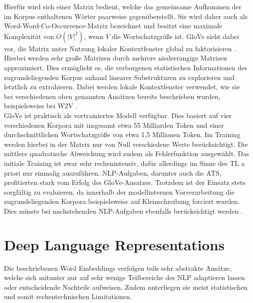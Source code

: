 \noindent
Hierfür wird sich einer Matrix bedient, welche das gemeinsame Aufkommen der im Korpus enthaltenen Wörter paarweise gegenüberstellt. Sie wird daher auch als Word-Word-Co-Occurrence-Matrix bezeichnet und besitzt eine maximale Komplexität von $O(|V|^2)$, wenn $V$ die Wortschatzgröße ist. \ac{GloVe} sieht dabei vor, die Matrix unter Nutzung lokaler Kontextfenster global zu faktorisieren \cite[S.~2]{PEN14}.\\

\noindent
Hierbei werden sehr große Matrizen durch mehrere niederrangige Matrizen approximiert. Dies ermöglicht es, die verborgenen statistischen Informationen des zugrundeliegenden Korpus anhand linearer Substrukturen zu explorieren und letztlich zu extrahieren. Dabei werden lokale Kontextfenster verwendet, wie sie bei verschiedenen oben genannten Ansätzen bereits beschrieben wurden, beispielsweise bei \ac{W2V} \cite[S.~24]{NIT19}.\\

\noindent
\ac{GloVe} ist praktisch als vortrainiertes Modell verfügbar. Dies basiert auf vier verschiedenen Korpora mit insgesamt etwa 55 Milliarden Token und einer durchschnittlichen Wortschatzgröße von etwa 1,5 Millionen Token. Im Training werden hierbei in der Matrix nur von Null verschiedene Werte berücksichtigt. Die mittlere quadratische Abweichung wird zudem als Fehlerfunktion ausgewählt. Das initiale Training ist zwar sehr rechenintensiv, dafür allerdings im Sinne des \ac{TL} a priori nur einmalig auszuführen. \ac{NLP}-Aufgaben, darunter auch die \ac{ATS}, profitierten stark vom Erfolg des \ac{GloVe}-Ansatzes. Trotzdem ist der Einsatz stets sorgfältig zu evaluieren, da innerhalb der modellinternen Vorverarbeitung die zugrundeliegenden Korpora beispielsweise auf Kleinschreibung forciert wurden. Dies müsste bei nachstehenden \ac{NLP}-Aufgaben ebenfalls berücksichtigt werden \cite[S.~6-9]{PEN14}.
\newpage


\section{Deep Language Representations}
\noindent
Die beschriebenen Word Embeddings verfolgen teils sehr abstrakte Ansätze, welche sich mitunter nur auf sehr wenige Teilbereiche des \ac{NLP} adaptieren lassen oder entscheidende Nachteile aufweisen. Zudem unterliegen sie meist statistischen und somit rechentechnischen Limitationen.\\

